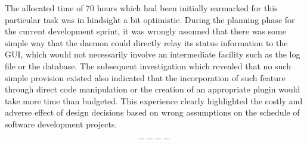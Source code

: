 The allocated time of 70 hours which had been initially earmarked for this particular task was in hindsight a bit optimistic. During the planning phase for the current development sprint, it was wrongly assumed that there was some simple way that the daemon could directly relay its status information to the GUI, which would not necessarily involve an intermediate facility such as the log file or the database. The subsequent investigation which revealed that no such simple provision existed also indicated that the incorporation of such feature through direct code manipulation or the creation of an appropriate plugin would take more time than budgeted. This experience clearly highlighted the costly and adverse effect of design decisions based on wrong assumptions on the schedule of software development projects.

\[----\]
